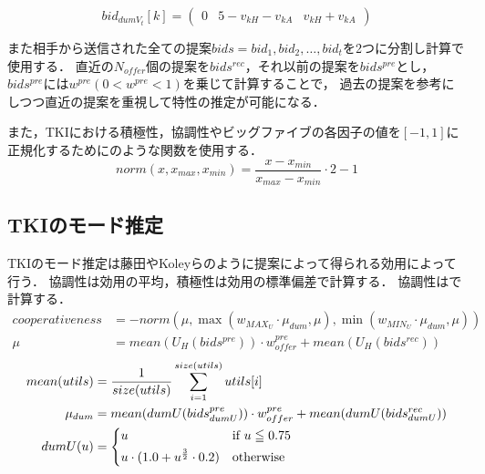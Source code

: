 \begin{equation}
    bid_{dumV_t}[k] = 
        \left(
    \begin{array}{rrr}
        0 & 5 - v_{kH} - v_{kA} & v_{kH} + v_{kA}
    \end{array}
    \right)
    \label{eq:dummyvalue}
\end{equation}

また相手から送信された全ての提案$bids = {bid_1, bid_2, \ldots , bid_t}$を2つに分割し計算で使用する．
直近の$N_{offer}$個の提案を$bids^{rec}$，それ以前の提案を$bids^{pre}$とし，$bids^{pre}$には$w^{pre}(0 < w^{pre} < 1)$を乗じて計算することで，
過去の提案を参考にしつつ直近の提案を重視して特性の推定が可能になる．

また，TKIにおける積極性，協調性やビッグファイブの各因子の値を$[-1, 1]$に正規化するためにのような関数を使用する．
\begin{equation}
    norm(x, x_{max}, x_{min}) = \frac{x - x_{min}}{x_{max} - x_{min}} \cdot 2 - 1
    \label{eq:normarize}
\end{equation}

\subsection{TKIのモード推定}
TKIのモード推定は藤田\cite{tki-aa}やKoleyら\cite{tki-ha}のように提案によって得られる効用によって行う．
協調性は効用の平均，積極性は効用の標準偏差で計算する．
協調性はで計算する．
\begin{align}
    cooperativeness &= -norm(\mu, \max (w_{MAX_U} \cdot \mu_{dum}, \mu), \min (w_{MIN_U} \cdot \mu_{dum}, \mu)) \label{eq:cooperativeness} \\
    \mu &= mean(U_H(bids^{pre})) \cdot w_{offer}^{pre} + mean(U_H(bids^{rec})) \nonumber 
\end{align}
\begin{align}
    mean(utils) &= \frac{1}{size(utils)}\sum_{i = 1}^{size(utils)} utils[i] \nonumber \\
    \mu_{dum} &= mean(dumU(bids_{dumU}^{pre})) \cdot w_{offer}^{pre} + mean(dumU(bids_{dumU}^{rec})) \nonumber \\
    dumU(u) &=
    \begin{cases*}
        u & if $u \leqq 0.75$ \\
        u \cdot (1.0 + u^{\frac{3}{2}} \cdot 0.2) & otherwise \\
    \end{cases*} \label{eq:dummyMean}
\end{align}

